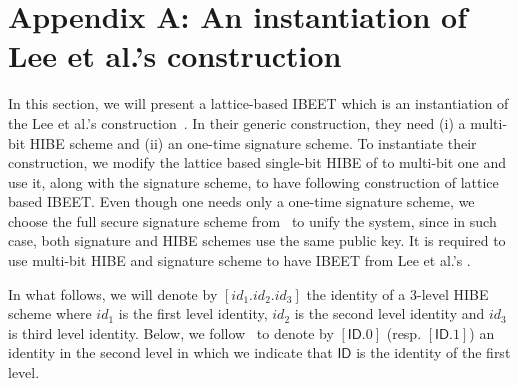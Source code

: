 \documentclass[runningheads]{llncs}
\def\ID{\mathsf{ID}}
\begin{document}
\section*{Appendix A: An instantiation of Lee et al.'s construction}
In this section, we will present a lattice-based IBEET which is an instantiation of the Lee et al.'s construction~\cite{Lee2016}. In their generic construction, they need (i) a multi-bit HIBE scheme and (ii) an one-time signature scheme. To instantiate their construction, we modify the lattice based single-bit HIBE of \cite{ABB10-EuroCrypt} to multi-bit one and use it, along with the signature scheme, to have following construction of lattice based IBEET.  Even though one needs only a one-time signature scheme, we choose the full secure signature scheme from~\cite{ABB10-EuroCrypt} to unify the system, since in such case, both signature and HIBE schemes use the same public key.
It is required to use multi-bit HIBE and signature scheme to have IBEET from Lee et al.'s \cite{Lee2016}.

In what follows, we will denote by $[id_1.id_2.id_3]$ the identity of a $3$-level HIBE scheme where $id_1$ is the first level identity, $id_2$ is the second level identity and $id_3$ is third level identity. Below, we follow~\cite{Lee2016} to denote by $[\ID.0]$ (resp.  $[\ID.1]$) an identity in the second level in which we indicate that $\ID$ is the identity of the first level.
\end{document}
